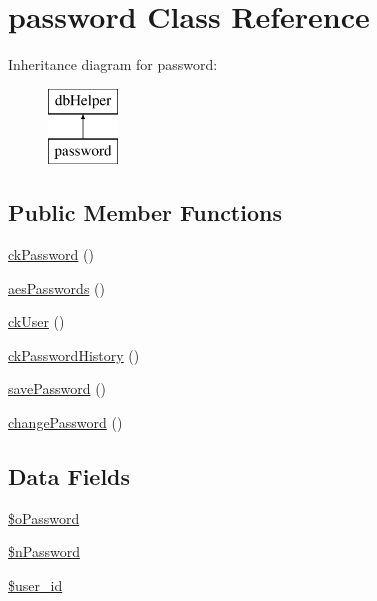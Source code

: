 \hypertarget{classpassword}{\section{password \-Class \-Reference}
\label{classpassword}
}
\-Inheritance diagram for password\-:\begin{figure}[H]
\begin{center}
\leavevmode
\includegraphics[height=2.000000cm]{classpassword}
\end{center}
\end{figure}
\subsection*{\-Public \-Member \-Functions}
\begin{DoxyCompactItemize}
\item 
\hyperlink{classpassword_ad683b488428ed0050a2a9bd340112ef7}{ck\-Password} ()
\item 
\hyperlink{classpassword_ac510763fa3e5086f9b276b02d3a1c62e}{aes\-Passwords} ()
\item 
\hyperlink{classpassword_a057e5955356e7dfe2592918e0803e0a5}{ck\-User} ()
\item 
\hyperlink{classpassword_ab5af18e43ddf0221ddf29758760ad0ab}{ck\-Password\-History} ()
\item 
\hyperlink{classpassword_adde61807440b2857289860112a3258dc}{save\-Password} ()
\item 
\hyperlink{classpassword_a2e40a3d94fef799ccf549b1417f395c1}{change\-Password} ()
\end{DoxyCompactItemize}
\subsection*{\-Data \-Fields}
\begin{DoxyCompactItemize}
\item 
\hyperlink{classpassword_a45254ea52f68306c737105b330ef23a8}{\$o\-Password}
\item 
\hyperlink{classpassword_abf6a1b81b2df703a88051df830fa4c3b}{\$n\-Password}
\item 
\hyperlink{classpassword_af0fcd925f00973e32f7214859dfb3c6b}{\$user\-\_\-id}
\end{DoxyCompactItemize}


